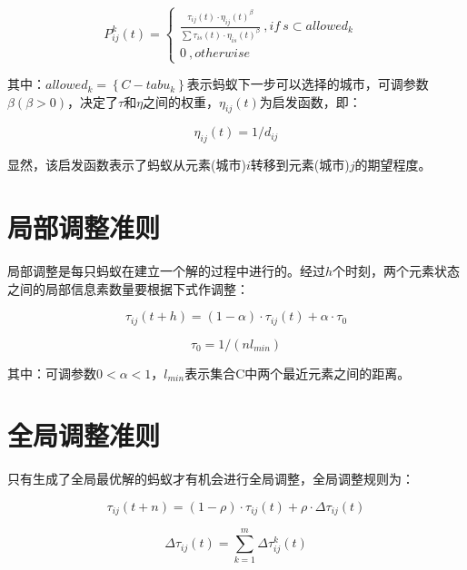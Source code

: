 \documentclass[a4paper,12pt]{report}
\begin{document}
\begin{spacing}{1.5}
	\begin{equation}
		P_{ij}^k(t) = \left\{  
			\begin{array}{lr}  
			   \frac{\tau_{ij}(t) \cdot \eta_{ij}(t)^\beta}{\sum \tau_{is}(t) \cdot \eta_{is}(t)^\beta}\ ,if \ s \subset allowed_k &  \\  
			   0\ , otherwise    
			 \end{array}  
			 \right. 
	\end{equation}
	
	其中：$allowed_k = \left\{C-tabu_k \right\}$表示蚂蚁下一步可以选择的城市，可调参数$\beta (\beta>0)$，决定了$\tau$和$\eta$之间的权重，$\eta_{ij}(t)$为启发函数，即：
	
	\begin{equation}
		\eta_{ij}(t) = 1/d_{ij} 
	\end{equation}

	显然，该启发函数表示了蚂蚁从元素(城市)$i$转移到元素(城市)$j$的期望程度。

	
		

\section{局部调整准则}
	局部调整是每只蚂蚁在建立一个解的过程中进行的。经过$h$个时刻，两个元素状态之间的局部信息素数量要根据下式作调整：
	
	\begin{equation}
		\tau_{ij}(t+h) = (1-\alpha)\cdot\tau_{ij}(t)+\alpha \cdot \tau_0
	\end{equation}

	\begin{equation}
		\tau_0 = 1/(nl_{min})
	\end{equation}
	
	其中：可调参数$0<\alpha<1$，$l_{min}$表示集合C中两个最近元素之间的距离。



\section{全局调整准则}
	只有生成了全局最优解的蚂蚁才有机会进行全局调整，全局调整规则为：
	
	\begin{equation}
		\tau_{ij}(t+n) = (1-\rho) \cdot\tau_{ij}(t)+ \rho \cdot \Delta \tau_{ij}(t)
	\end{equation}

	\begin{equation}
		\Delta \tau_{ij}(t) = \sum_{k=1}^{m} \Delta \tau_{ij}^k(t)
	\end{equation}


\end{spacing}
\end{document}
